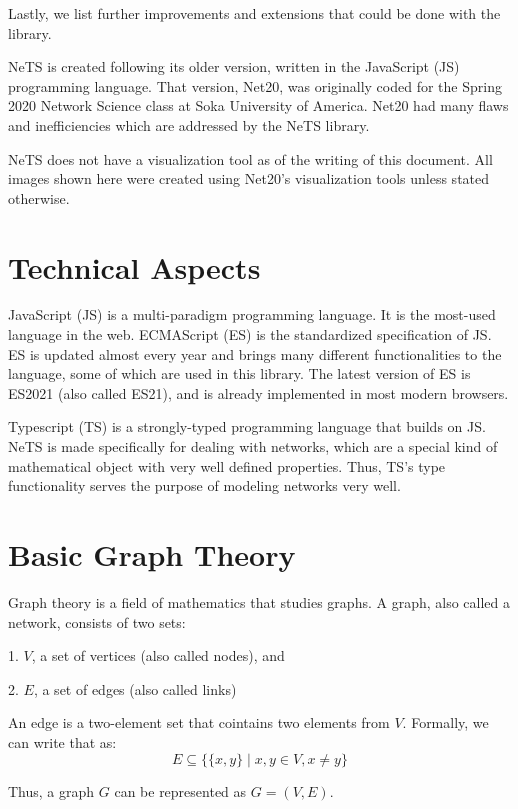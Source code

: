 Lastly, we list further improvements and extensions that could be done with the library.

NeTS is created following its older version, written in the JavaScript (JS) programming language.
That version, Net20, was originally coded for the Spring 2020 Network Science class
at Soka University of America.
Net20 had many flaws and inefficiencies which are addressed by the NeTS library.

NeTS does not have a visualization tool as of the writing of this document.
All images shown here were created using Net20's visualization tools unless stated otherwise.

\section{Technical Aspects}

JavaScript (JS) is a multi-paradigm programming language.
It is the most-used language in the web.
ECMAScript (ES) is the standardized specification of JS.
ES is updated almost every year and brings many different functionalities to the language, some of which are used in this library.
The latest version of ES is ES2021 (also called ES21),
and is already implemented in most modern browsers.

Typescript (TS) is a strongly-typed programming language that builds on JS.
NeTS is made specifically for dealing with networks,
which are a special kind of mathematical object with very well defined properties.
Thus, TS's type functionality serves the purpose of modeling networks very well.

\section{Basic Graph Theory}

Graph theory is a field of mathematics that studies graphs.
A graph, also called a network, consists of two sets:

1. $V$, a set of vertices (also called nodes), and

2. $E$, a set of edges (also called links)

An edge is a two-element set that cointains two elements from $V$.
Formally, we can write that as:
$$E\subseteq \{\{x,y\}\mid x,y\in V, x\ne y\}$$

Thus, a graph $G$ can be represented as $G=(V,E)$.


